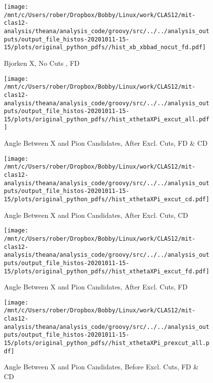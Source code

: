 \documentclass{article}
\begin{document}
\begin{landscape}
    \begin{figure}[h]
        \centering

        \texttt{[image: /mnt/c/Users/rober/Dropbox/Bobby/Linux/work/CLAS12/mit-clas12-analysis/theana/analysis\_code/groovy/src/../../analysis\_outputs/output\_file\_histos-20201011-15-15/plots/original\_python\_pdfs//hist\_xb\_xbbad\_nocut\_fd.pdf]}
        \captionsetup{textformat=empty,labelformat=blank}
        \caption{Bjorken X, No Cuts , FD}
    \end{figure}
    \clearpage
    
    \begin{figure}[h]
        \centering

        \texttt{[image: /mnt/c/Users/rober/Dropbox/Bobby/Linux/work/CLAS12/mit-clas12-analysis/theana/analysis\_code/groovy/src/../../analysis\_outputs/output\_file\_histos-20201011-15-15/plots/original\_python\_pdfs//hist\_xthetaXPi\_excut\_all.pdf]}
        \captionsetup{textformat=empty,labelformat=blank}
        \caption{Angle Between X and Pion Candidates, After Excl. Cuts, FD \& CD}
    \end{figure}
    \clearpage
    
    \begin{figure}[h]
        \centering

        \texttt{[image: /mnt/c/Users/rober/Dropbox/Bobby/Linux/work/CLAS12/mit-clas12-analysis/theana/analysis\_code/groovy/src/../../analysis\_outputs/output\_file\_histos-20201011-15-15/plots/original\_python\_pdfs//hist\_xthetaXPi\_excut\_cd.pdf]}
        \captionsetup{textformat=empty,labelformat=blank}
        \caption{Angle Between X and Pion Candidates, After Excl. Cuts, CD}
    \end{figure}
    \clearpage
    
    \begin{figure}[h]
        \centering

        \texttt{[image: /mnt/c/Users/rober/Dropbox/Bobby/Linux/work/CLAS12/mit-clas12-analysis/theana/analysis\_code/groovy/src/../../analysis\_outputs/output\_file\_histos-20201011-15-15/plots/original\_python\_pdfs//hist\_xthetaXPi\_excut\_fd.pdf]}
        \captionsetup{textformat=empty,labelformat=blank}
        \caption{Angle Between X and Pion Candidates, After Excl. Cuts, FD}
    \end{figure}
    \clearpage
    
    \begin{figure}[h]
        \centering

        \texttt{[image: /mnt/c/Users/rober/Dropbox/Bobby/Linux/work/CLAS12/mit-clas12-analysis/theana/analysis\_code/groovy/src/../../analysis\_outputs/output\_file\_histos-20201011-15-15/plots/original\_python\_pdfs//hist\_xthetaXPi\_prexcut\_all.pdf]}
        \captionsetup{textformat=empty,labelformat=blank}
        \caption{Angle Between X and Pion Candidates, Before Excl. Cuts, FD \& CD}
    \end{figure}
    \clearpage
    

\end{landscape}
\end{document}
